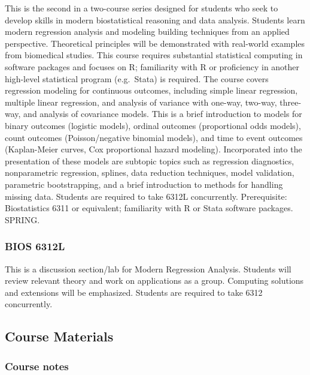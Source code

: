 \documentclass[
  letterpaper,
  DIV=11,
  numbers=noendperiod]{scrartcl}
\begin{document}
This is the second in a two-course series designed for students who seek
to develop skills in modern biostatistical reasoning and data analysis.
Students learn modern regression analysis and modeling building
techniques from an applied perspective. Theoretical principles will be
demonstrated with real-world examples from biomedical studies. This
course requires substantial statistical computing in software packages
and focuses on R; familiarity with R or proficiency in another
high-level statistical program (e.g.~Stata) is required. The course
covers regression modeling for continuous outcomes, including simple
linear regression, multiple linear regression, and analysis of variance
with one-way, two-way, three-way, and analysis of covariance models.
This is a brief introduction to models for binary outcomes (logistic
models), ordinal outcomes (proportional odds models), count outcomes
(Poisson/negative binomial models), and time to event outcomes
(Kaplan-Meier curves, Cox proportional hazard modeling). Incorporated
into the presentation of these models are subtopic topics such as
regression diagnostics, nonparametric regression, splines, data
reduction techniques, model validation, parametric bootstrapping, and a
brief introduction to methods for handling missing data. Students are
required to take 6312L concurrently. Prerequisite: Biostatistics 6311 or
equivalent; familiarity with R or Stata software packages. SPRING.

\hypertarget{bios-6312l}{%
\subsubsection{BIOS 6312L}\label{bios-6312l}}

This is a discussion section/lab for Modern Regression Analysis.
Students will review relevant theory and work on applications as a
group. Computing solutions and extensions will be emphasized. Students
are required to take 6312 concurrently.

\hypertarget{course-materials}{%
\subsection{Course Materials}\label{course-materials}}

\hypertarget{course-notes}{%
\subsubsection{Course notes}\label{course-notes}}
\end{document}
